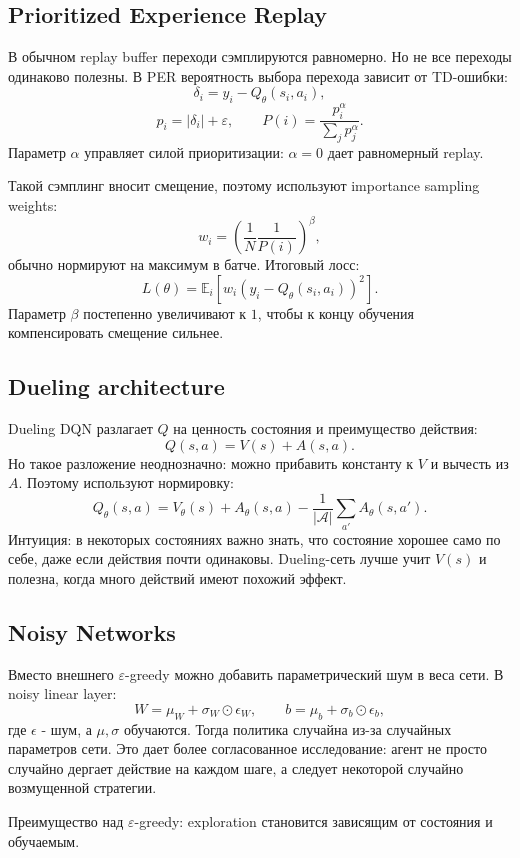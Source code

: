 \documentclass[11pt,a4paper]{article}
\newcommand{\E}{\mathbb{E}}
\newcommand{\1}{\mathbf{1}}
\newcommand{\cA}{\mathcal A}
\begin{document}
\subsection*{Prioritized Experience Replay}
В обычном replay buffer переходи сэмплируются равномерно. Но не все переходы одинаково полезны. В PER вероятность выбора перехода зависит от TD-ошибки:
\[
    \delta_i = y_i-Q_\theta(s_i,a_i),
\]
\[
    p_i=|\delta_i|+\varepsilon,
    \qquad
    P(i)=\frac{p_i^\alpha}{\sum_j p_j^\alpha}.
\]
Параметр $\alpha$ управляет силой приоритизации: $\alpha=0$ дает равномерный replay.

Такой сэмплинг вносит смещение, поэтому используют importance sampling weights:
\[
    w_i=\left(\frac1{N}\frac1{P(i)}\right)^\beta,
\]
обычно нормируют на максимум в батче. Итоговый лосс:
\[
    L(\theta)=\E_i\left[w_i\left(y_i-Q_\theta(s_i,a_i)\right)^2\right].
\]
Параметр $\beta$ постепенно увеличивают к $1$, чтобы к концу обучения компенсировать смещение сильнее.

\subsection*{Dueling architecture}
Dueling DQN разлагает $Q$ на ценность состояния и преимущество действия:
\[
    Q(s,a)=V(s)+A(s,a).
\]
Но такое разложение неоднозначно: можно прибавить константу к $V$ и вычесть из $A$. Поэтому используют нормировку:
\[
    Q_\theta(s,a)=V_\theta(s)+A_\theta(s,a)-\frac1{|\cA|}\sum_{a'}A_\theta(s,a').
\]
Интуиция: в некоторых состояниях важно знать, что состояние хорошее само по себе, даже если действия почти одинаковы. Dueling-сеть лучше учит $V(s)$ и полезна, когда много действий имеют похожий эффект.

\subsection*{Noisy Networks}
Вместо внешнего $\varepsilon$-greedy можно добавить параметрический шум в веса сети. В noisy linear layer:
\[
    W = \mu_W + \sigma_W\odot\epsilon_W,
    \qquad
    b = \mu_b + \sigma_b\odot\epsilon_b,
\]
где $\epsilon$ - шум, а $\mu,\sigma$ обучаются. Тогда политика случайна из-за случайных параметров сети. Это дает более согласованное исследование: агент не просто случайно дергает действие на каждом шаге, а следует некоторой случайно возмущенной стратегии.

Преимущество над $\varepsilon$-greedy: exploration становится зависящим от состояния и обучаемым.
\end{document}
